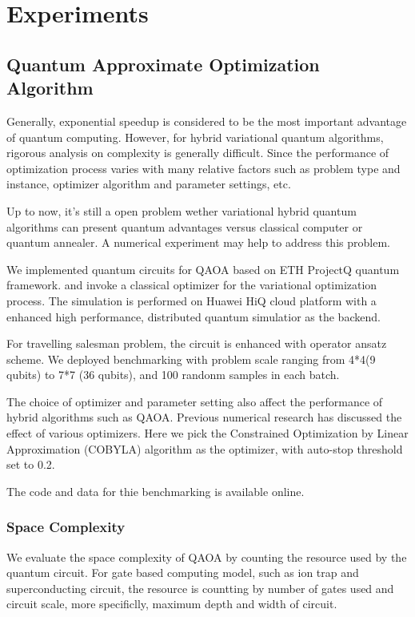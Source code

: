 \documentclass[aps,pra,twocolumn,superscriptaddress]{revtex4-2}
\begin{document}
\section{Experiments}
\subsection{Quantum Approximate Optimization Algorithm} 

Generally, exponential speedup is considered to be the most important advantage of quantum computing. However, for hybrid variational quantum algorithms, rigorous analysis on complexity is generally difficult. Since the performance of optimization process varies with many relative factors such as problem type and instance, optimizer algorithm and parameter settings, etc. 

Up to now, it's still a open problem wether variational hybrid quantum algorithms can present quantum advantages versus classical computer or quantum annealer. A numerical experiment may help to address this problem.

We implemented quantum circuits for QAOA based on ETH ProjectQ quantum framework\cite{}. and invoke a classical optimizer for the variational optimization process. The simulation is performed on Huawei HiQ cloud platform\cite{} with a enhanced high performance, distributed quantum simulatior as the backend. 

For travelling salesman problem, the circuit is enhanced with operator ansatz scheme. We deployed benchmarking with problem scale ranging from 4*4(9 qubits) to 7*7 (36 qubits), and 100 randonm samples in each batch. 

The choice of optimizer and parameter setting also affect the performance of hybrid algorithms such as QAOA. Previous numerical research has discussed the effect of various optimizers\cite{}. Here we pick the Constrained Optimization by Linear Approximation (COBYLA) algorithm as the optimizer, with auto-stop threshold set to 0.2.


The code and data for thie benchmarking is available online\cite{}.


\subsubsection{Space Complexity}
We evaluate the space complexity of QAOA by counting the resource used by the quantum circuit\cite{}. For gate based computing model, such as ion trap and superconducting circuit\cite{}, the resource is countting by number of gates used and circuit scale, more specificlly, maximum depth and width of circuit.  
\end{document}
